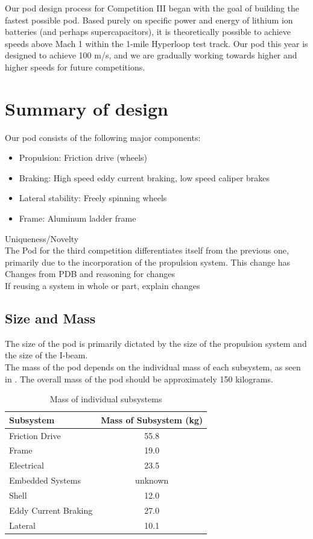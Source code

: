 \documentclass[main.tex]{subfiles}
\begin{document}
\begin{flushleft}
Our pod design process for Competition III began with the goal of building the fastest possible pod. Based purely on specific power and energy of lithium ion batteries (and perhaps supercapacitors), it is theoretically possible to achieve speeds above Mach 1 within the 1-mile Hyperloop test track. Our pod this year is designed to achieve 100 m/s, and we are gradually working towards higher and higher speeds for future competitions.


\section{Summary of design}
Our pod consists of the following major components:
\begin{itemize}
    \item Propulsion: Friction drive (wheels)
    \item Braking: High speed eddy current braking, low speed caliper brakes
    \item Lateral stability: Freely spinning wheels
    \item Frame: Aluminum ladder frame
\end{itemize}
Uniqueness/Novelty\\
The Pod for the third competition differentiates itself from the previous one, primarily due to the incorporation of the propulsion system. This change has 
Changes from PDB and reasoning for changes\\
If reusing a system in whole or part, explain changes\\

\subsection{Size and Mass}
The size of the pod is primarily dictated by the size of the propulsion system and the size of the I-beam.\\
  The mass of the pod depends on the individual mass of each subsystem, as seen in . The overall mass of the pod should be approximately 150 kilograms. 

\begin{table}
\centering
\begin{tabular}{@{}lc@{}}
	\toprule Subsystem & Mass of Subsystem (\si{kg}) \\ \midrule
    Friction Drive & 55.8 \\
    Frame & 19.0 \\
    Electrical & 23.5 \\
    Embedded Systems & unknown \\ 
    Shell & 12.0 \\ 
    Eddy Current Braking & 27.0 \\
    Lateral & 10.1 \\ 
    \end{tabular}
  \caption{Mass of individual subsystems}
  \label{table:mass}
\end{table}
    

\end{flushleft}
\end{document}
